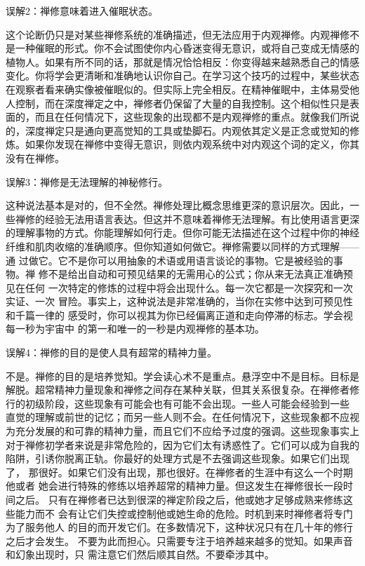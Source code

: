\subsectnon 误解2：禅修意味着进入催眠状态。

这个论断仍只是对某些禅修系统的准确描述，但无法应用于内观禅修。内观禅修不
是一种催眠的形式。你不会试图使你内心昏迷变得无意识，或将自己变成无情感的
植物人。如果有所不同的话，那就是情况恰恰相反：你变得越来越熟悉自己的情感
变化。你将学会更清晰和准确地认识你自己。在学习这个技巧的过程中，某些状态
在观察者看来确实像被催眠似的。但实际上完全相反。在精神催眠中，主体易受他
人控制，而在深度禅定之中，禅修者仍保留了大量的自我控制。这个相似性只是表
面的，而且在任何情况下，这些现象的出现都不是内观禅修的重点。就像我们所说
的，深度禅定只是通向更高觉知的工具或垫脚石。内观依其定义是正念或觉知的修
炼。如果你发现在禅修中变得无意识，则依内观系统中对内观这个词的定义，你其
没有在禅修。

\subsectnon \1误解3：禅修是无法理解的神秘修行。

这种说法基本是对的，但不全然。禅修处理比概念思维更深的意识层次。因此，一
些禅修的经验无法用语言表达。但这并不意味着禅修无法理解。有比使用语言更深
的理解事物的方式。你能理解如何行走。但你可能无法描述在这个过程中你的神经
纤维和肌肉收缩的准确顺序。但你知道如何做它。禅修需要以同样的方式理解——通
过做它。它不是你可以用抽象的术语或用语言谈论的事物。它是被经验的事物。禅
修不是给出自动和可预见结果的无需用心的公式；你从来无法真正准确预见在任何
一次特定的修炼的过程中将会出现什么。每一次它都是一次探究和一次实证、一次
冒险。事实上，这种说法是非常准确的，当你在实修中达到可预见性和千篇一律的
感受时，你可以视其为你已经偏离正道和走向停滞的标志。学会视每一秒为宇宙中
的第一和唯一的一秒是内观禅修的基本功。

\subsectnon 误解4：禅修的目的是使人具有超常的精神力量。

不是。禅修的目的是培养觉知。学会读心术不是重点。悬浮空中不是目标。目标是
解脱。超常精神力量现象和禅修之间存在某种关联，但其关系很复杂。在禅修者修
行的初级阶段，这些现象有可能会也有可能不会出现。一些人可能会\1经验到一些
直觉的理解或前世的记忆；而另一些人则不会。在任何情况下，这些现象都不应视
为充分发展的和可靠的精神力量，而且它们不应给予过度的强调。这些现象事实上
对于禅修初学者来说是非常危险的，因为它们太有诱惑性了。它们可以成为自我的
陷阱，引诱你脱离正轨。你最好的处理方式是不去强调这些现象。如果它们出现了，
那很好。如果它们没有出现，那也很好。在禅修者的生涯中有这么一个时期他或者
她会进行特殊的修练以培养超常的精神力量。但这发生在禅修很长一段时间之后。
只有在禅修者已达到很深的禅定阶段之后，他或她才足够成熟来修练这些能力而不
会有让它们失控或控制他或她生命的危险。时机到来时禅修者将专门为了服务他人
的目的而开发它们。在多数情况下，这种状况只有在几十年的修行之后才会发生。
不要为此而担心。只需要专注于培养越来越多的觉知。如果声音和幻象出现时，只
需注意它们然后顺其自然。不要牵涉其中。

